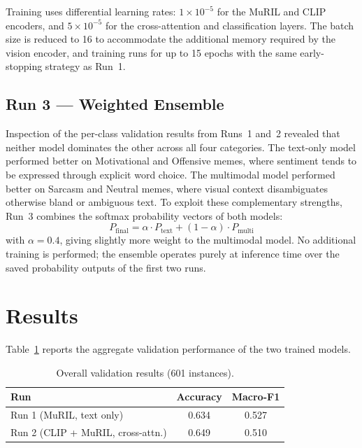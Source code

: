 \documentclass[
]{ceurart}
\begin{document}
Training uses differential learning rates: $1 \times 10^{-5}$ for the MuRIL and CLIP encoders, and $5 \times 10^{-5}$ for the cross-attention and classification layers. The batch size is reduced to 16 to accommodate the additional memory required by the vision encoder, and training runs for up to 15 epochs with the same early-stopping strategy as Run~1.

\subsection{Run 3 --- Weighted Ensemble}

Inspection of the per-class validation results from Runs~1 and~2 revealed that neither model dominates the other across all four categories. The text-only model performed better on Motivational and Offensive memes, where sentiment tends to be expressed through explicit word choice. The multimodal model performed better on Sarcasm and Neutral memes, where visual context disambiguates otherwise bland or ambiguous text. To exploit these complementary strengths, Run~3 combines the softmax probability vectors of both models:
\begin{equation}
P_{\text{final}} = \alpha \cdot P_{\text{text}} + (1 - \alpha) \cdot P_{\text{multi}}
\end{equation}
with $\alpha = 0.4$, giving slightly more weight to the multimodal model. No additional training is performed; the ensemble operates purely at inference time over the saved probability outputs of the first two runs.

\section{Results}

Table~\ref{tab:overall} reports the aggregate validation performance of the two trained models.

\begin{table}[h]
\caption{Overall validation results (601 instances).}
\label{tab:overall}
\begin{tabular}{lcc}
\toprule
\textbf{Run} & \textbf{Accuracy} & \textbf{Macro-F1} \\
\midrule
Run 1 (MuRIL, text only)           & 0.634 & 0.527 \\
Run 2 (CLIP + MuRIL, cross-attn.)  & 0.649 & 0.510 \\
\bottomrule
\end{tabular}
\end{table}
\end{document}
